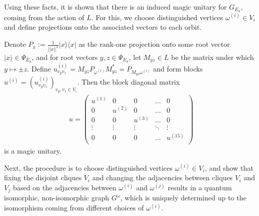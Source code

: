 Using these facts, it is shown that there is an induced magic unitary for $G_{E_8}$, coming from 
the action of $L$. For this, we choose distinguished vertices $\omega^{(i)} \in V_i$
and define projections onto the associated vectors to each orbit. 
\begin{lemma}
    Denote $P_x := \frac{1}{||x||^2} |x\rangle \langle x|$ as the rank-one projection onto
    some root vector $|x\rangle \in \Psi_{E_8}$, and for root vectors $y, z \in \Psi_{E_8}$,
    let $M_{yz} \in L$ be the matrix under which $y \mapsto \pm z$.
    Define $u^{(i)}_{v_y v_z} = M_{yz} P_{\omega^{(i)}} M_{yz}^* = P_{M_{yz} \omega^{(i)}}$
    and form blocks $u^{(i)} = (u^{(i)}_{v_y v_z})_{v_y, v_z \in V_i}$.
    Then the block diagonal matrix 
    \begin{align}
        u = \begin{pmatrix}
        u^{(1)} & 0 & 0 & \dots & 0\\
        0 & u^{(2)} & 0 & \dots & 0\\
        0 & 0 & u^{(3)} & \dots & 0\\
        \vdots & \vdots & \vdots & \ddots & \vdots\\
        0 & 0 & 0 & \dots & u^{(15)} \\
        \end{pmatrix}
    \end{align}
    is a magic unitary.
\end{lemma}
Next, the procedure
is to choose distinguished vertices $\omega^{(i)} \in V_i$,
and show that fixing the disjoint cliques $V_i$ and
changing the adjacencies between cliques $V_i$ and $V_j$
based on the adjacencies between $\omega^{(i)}$ and $\omega^{(j)}$ results
in a quantum isomorphic, non-isomorphic graph $G^{\omega}$,
which is uniquely determined up to the isomorphism coming from
different choices of $\omega^{(i)}$.

